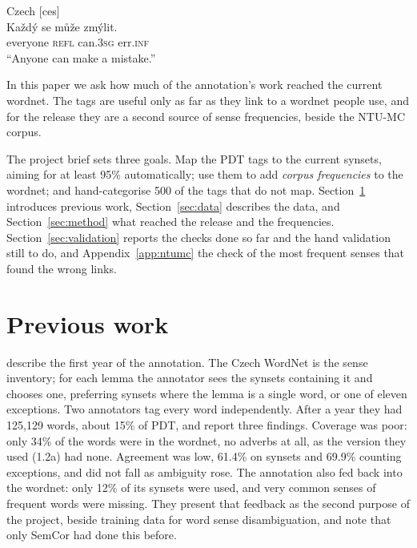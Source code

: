 \documentclass[a4paper,12pt]{article}
\newcommand{\gm}[1]{\textsc{\MakeLowercase{#1}}}
\begin{document}
\begin{exe}
  \ex \label{ex:moci} Czech [ces] \\
      \gll Každý se může zmýlit. \\
           everyone \gm{refl} can.\gm{3sg} err.\gm{inf} \\
  \trans ``Anyone can make a mistake.'' \hfill \citep{cwn19pdt2011}
\end{exe}

In this paper we ask how much of the annotation's work reached the
current wordnet.  The tags are useful only as far as they link to a
wordnet people use, and for the release they are a second source of
sense frequencies, beside the NTU-MC corpus.

The project brief sets three goals.  Map the PDT tags to the current
synsets, aiming for at least 95\% automatically; use them to add
\emph{corpus frequencies} to the wordnet; and hand-categorise 500 of
the tags that do not map. Section~\ref{sec:previous} introduces
previous work, Section~\ref{sec:data} describes the data, and
Section~\ref{sec:method} what reached the release and the frequencies.
Section~\ref{sec:validation} reports the checks done so far and the
hand validation still to do, and Appendix~\ref{app:ntumc} the check of
the most frequent senses that found the wrong links.

\section{Previous work}
\label{sec:previous}

\citet{hajic-etal2004} describe the first year of the annotation.  The
Czech WordNet is the sense inventory; for each lemma the annotator sees
the synsets containing it and chooses one, preferring synsets where the
lemma is a single word, or one of eleven exceptions.  Two annotators tag
every word independently.  After a year they had 125,129 words, about
15\% of PDT, and report three findings.  Coverage was poor:
only 34\% of the words were in the wordnet, no adverbs at all, as the
version they used (1.2a) had none.  Agreement was low, 61.4\% on synsets
and 69.9\% counting exceptions, and did not fall as ambiguity rose.  The annotation also fed back into the wordnet: only 12\% of its synsets were
used, and very common senses of frequent words were missing.  They
present that feedback as the second purpose of the project, beside
training data for word sense disambiguation, and note that only SemCor
\citep{landes-etal1998} had done this before.
\end{document}
